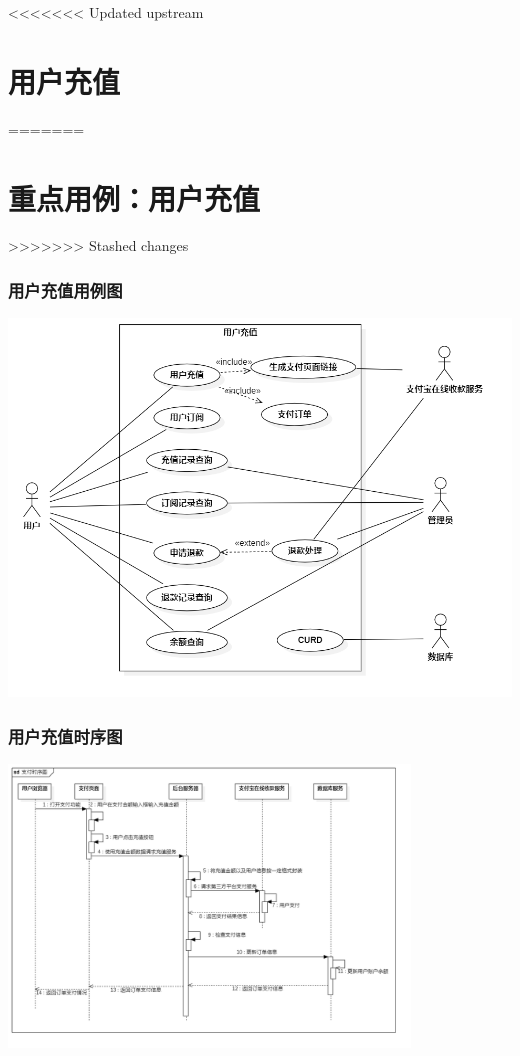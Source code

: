 <<<<<<< Updated upstream
\section{用户充值}
=======
\section{重点用例：用户充值}
>>>>>>> Stashed changes
\begin{frame}
    \frametitle{用户充值用例图}
    \center
    \includegraphics[scale=0.3]{contents/figure/recharge_usecase_diagram.png}
\end{frame}
\begin{frame}
    \frametitle{用户充值时序图}
    \center
    \includegraphics[width=4.2in]{contents/figure/recharge_sequence_diagram.png}
\end{frame}
